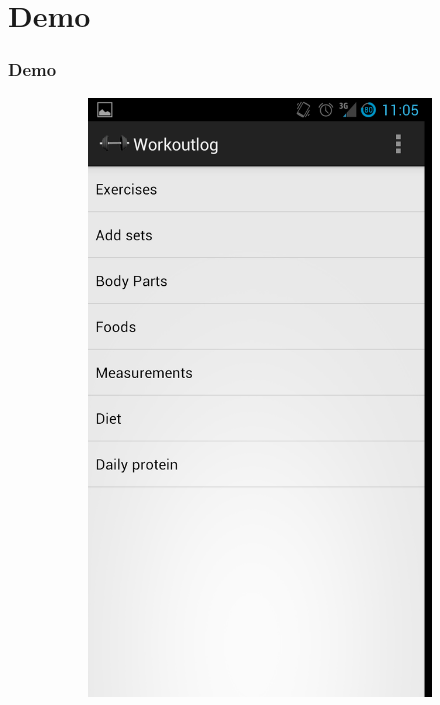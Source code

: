\documentclass[]{beamer}
\begin{document}
\section{Demo}
\begin{frame}
\frametitle{Demo}


\begin{figure}
    \centering
    \begin{subfigure}[b]{0.3\textwidth}
        \centering
        \includegraphics[width=\textwidth]{images/ss1.png}
    \end{subfigure}%

\end{figure}
\end{frame}
\end{document}
